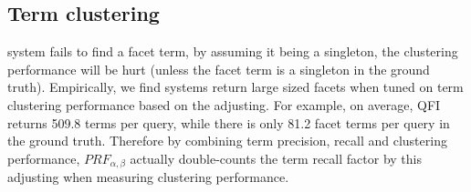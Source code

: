 \subsection{Term clustering}
system fails to find a facet term, by assuming it being a singleton, the clustering performance will be hurt (unless the facet term is a singleton in the ground truth). Empirically, we find systems return large sized facets when tuned on term clustering performance based on the adjusting. For example, on average, QFI returns 509.8 terms per query, while there is only 81.2 facet terms per query in the ground truth. Therefore by combining term precision, recall and clustering performance, $P\!R\!F_{\alpha,\beta}$ actually double-counts the term recall factor by this adjusting when measuring clustering performance. 

